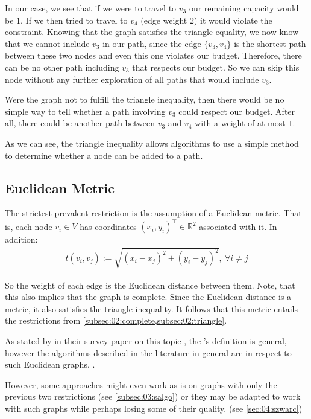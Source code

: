 In our case, we see that if we were to travel to $v_3$ our remaining capacity would be $1$.
If we then tried to travel to $v_4$ (edge weight $2$) it would violate the constraint.
Knowing that the graph satisfies the triangle equality, we now know that we cannot include $v_3$ in our path, since the edge $\{v_3, v_4\}$ is the shortest path between these two nodes and even this one violates our budget.
Therefore, there can be no other path including $v_3$ that respects our budget.
So we can skip this node without any further exploration of all paths that would include $v_3$.

Were the graph not to fulfill the triangle inequality, then there would be no simple way to tell whether a path involving $v_3$ could respect our budget.
After all, there could be another path between $v_3$ and $v_4$ with a weight of at most $1$.

As we can see, the triangle inequality allows algorithms to use a simple method to determine whether a node can be added to a path.

\subsection{Euclidean Metric}
\label{subsec:02:euclidean}

The strictest prevalent restriction is the assumption of a Euclidean metric.
That is, each node $v_i \in V$ has coordinates $(x_i, y_i)^\intercal \in \mathbb{R}^2$ associated with it.
In addition:
\begin{align*}
	t(v_i,v_j) := \sqrt{(x_i - x_j)^2 + (y_i - y_j)^2},\ \forall i \neq j
\end{align*}

So the weight of each edge is the Euclidean distance between them. Note, that this also implies that the graph is complete.
Since the Euclidean distance is a metric, it also satisfies the triangle inequality.
It follows that this metric entails the restrictions from \cref{subsec:02:complete,subsec:02:triangle}.

As stated by \citeauthor{vansteenwegen_orienteering_2011} in their survey paper on this topic \cite{vansteenwegen_orienteering_2011}, the \op's definition is general, however the algorithms described in the literature in general are in respect to such Euclidean graphs. \cite{golden_orienteering_1987,tsiligiridis_heuristic_1984,szwarc_novel_2022,geem_harmony_2005}.

However, some approaches might even work as is on graphs with only the previous two restrictions (see \cref{subsec:03:salgo}) or they may be adapted to work with such graphs while perhaps losing some of their quality. (see \cref{sec:04:szwarc})

